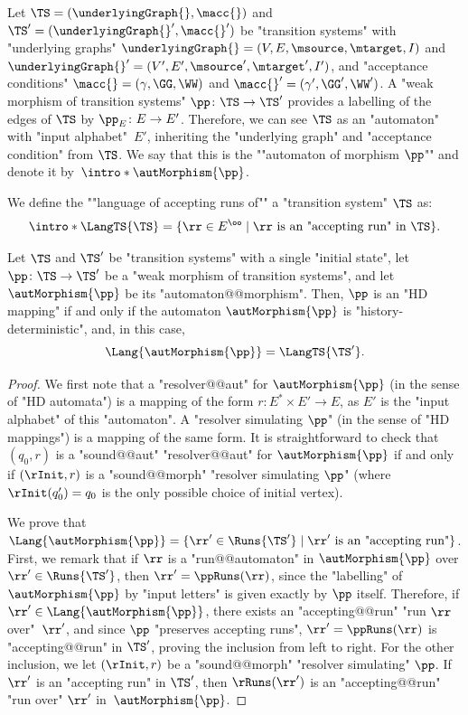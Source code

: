 \documentclass[10pt,a4paper]{amsart}
\renewcommand{\gg}{\gamma}
\begin{document}
\AP Let $\TS = (\underlyingGraph{}, \macc{})$ and $\TS' = (\underlyingGraph{}', \macc{}')$ be "transition systems" with "underlying graphs" $\underlyingGraph{} =(V ,E , \msource , \mtarget, I)$ and $\underlyingGraph{}' =(V' ,E' , \msource' , \mtarget', I')$, and "acceptance conditions" $\macc{} = (\gg, \GG, \WW)$ and  $\macc{}' = (\gg', \GG', \WW')$. 
A "weak morphism of transition systems" $\pp\colon \TS \to \TS'$ provides a labelling of the edges of $\TS$ by $\pp_E\colon E \to E'$. Therefore, we can see $\TS$ as an "automaton" with "input alphabet"~$E'$, inheriting the "underlying graph" and "acceptance condition" from $\TS$. 
We say that this is the ""automaton of morphism $\pp$"" and denote it by~$\intro*\autMorphism{\pp}$.

\AP We define the ""language of accepting runs of"" a "transition system" $\TS$ as:
\[ \intro*\LangTS{\TS} = \{\rr\in E^\oo \mid \rr \text{ is an "accepting run" in } \TS \}. \]


\begin{lemma}\label{lemma-acd:morphism_HD-iff-automaton-HD}
	Let $\TS$ and $\TS'$ be "transition systems" with a single "initial state", let $\pp\colon \TS \to \TS'$ be a "weak morphism of transition systems", and let $\autMorphism{\pp}$ be its "automaton@@morphism".
	Then, $\pp$ is an "HD mapping" if and only if the automaton $\autMorphism{\pp}$ is "history-deterministic", and, in this case, \[\Lang{\autMorphism{\pp}} = \LangTS{\TS'}.\]
\end{lemma}
\begin{proof}
	We first note that a "resolver@@aut" for $\autMorphism{\pp}$ (in the sense of "HD automata") is a mapping of the form $r\colon E^* \times E' \to E$, as $E'$ is the "input alphabet" of this "automaton". A "resolver simulating $\pp$" (in the sense of "HD mappings") is a mapping of the same form.
	It is straightforward to check that $(q_0, r)$ is a "sound@@aut" "resolver@@aut" for $\autMorphism{\pp}$ if and only if $(\rInit, r)$ is a "sound@@morph" "resolver simulating $\pp$" (where $\rInit(q_0') = q_0$ is the only possible choice of initial vertex).
	
	
	We prove that $\Lang{\autMorphism{\pp}} = \{\rr'\in \Runs{\TS'} \mid \rr' \text{ is an "accepting run"}\}$. 
	First, we remark that if $\rr$ is a "run@@automaton" in $\autMorphism{\pp}$ over $\rr'\in\Runs{\TS'}$, then $\rr' = \ppRuns(\rr)$, since the "labelling" of $\autMorphism{\pp}$ by "input letters" is given exactly by $\pp$ itself. Therefore, if $\rr'\in \Lang{\autMorphism{\pp}}$, there exists an "accepting@@run" "run $\rr$ over"~$\rr'$, and since $\pp$ "preserves accepting runs",  $\rr' = \ppRuns(\rr)$ is "accepting@@run" in $\TS'$, proving the inclusion from left to right. For the other inclusion, we let $(\rInit, r)$ be a "sound@@morph" "resolver simulating" $\pp$. If $\rr'$ is an "accepting run" in $\TS'$, then $\rRuns(\rr')$ is an "accepting@@run" "run over" $\rr'$ in~$\autMorphism{\pp}$.
\end{proof}
\end{document}
